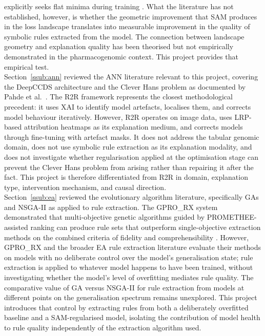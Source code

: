 explicitly seeks flat minima during training \cite{Springer2024}. What the literature has not
established, however, is whether the geometric improvement that SAM produces in the loss landscape
translates into measurable improvement in the quality of symbolic rules extracted from the model. The
connection between landscape geometry and explanation quality has been theorised but not empirically
demonstrated in the pharmacogenomic context. This project provides that empirical test.
\\
Section~\ref{ssub:ann} reviewed the ANN literature relevant to this project, covering the DeepCCDS
architecture and the Clever Hans problem as documented by Pahde et al.~\cite{Pahde2023}. The R2R
framework represents the closest methodological precedent: it uses XAI to identify model artefacts,
localises them, and corrects model behaviour iteratively. However, R2R operates on image data, uses
LRP-based attribution heatmaps as its explanation medium, and corrects models through fine-tuning with
artefact masks. It does not address the tabular genomic domain, does not use symbolic rule extraction
as its explanation modality, and does not investigate whether regularisation applied at the
optimisation stage can prevent the Clever Hans problem from arising rather than repairing it after the
fact. This project is therefore differentiated from R2R in domain, explanation type, intervention
mechanism, and causal direction.
\\
Section~\ref{ssub:ea} reviewed the evolutionary algorithm literature, specifically GAs and NSGA-II as
applied to rule extraction. The GPRO\_RX system demonstrated that multi-objective genetic algorithms
guided by PROMETHEE-assisted ranking can produce rule sets that outperform single-objective extraction
methods on the combined criteria of fidelity and comprehensibility \cite{Yedjour2024}. However,
GPRO\_RX and the broader EA rule extraction literature evaluate their methods on models with no
deliberate control over the model's generalisation state; rule extraction is applied to whatever model
happens to have been trained, without investigating whether the model's level of overfitting mediates
rule quality. The comparative value of GA versus NSGA-II for rule extraction from models at different
points on the generalisation spectrum remains unexplored. This project introduces that control by
extracting rules from both a deliberately overfitted baseline and a SAM-regularised model, isolating
the contribution of model health to rule quality independently of the extraction algorithm used.
\\
